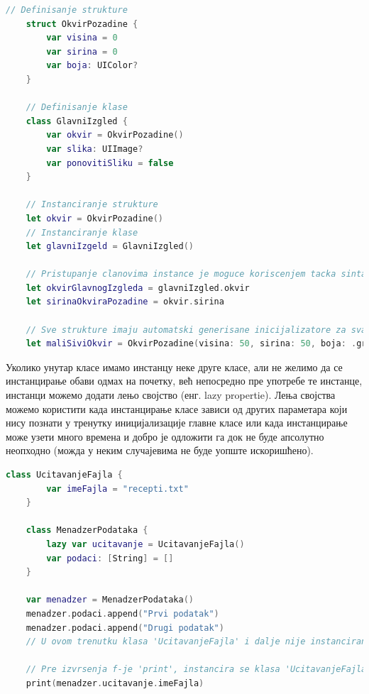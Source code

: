 \documentclass[12pt,oneside]{memoir}
\begin{document}
\begin{lstlisting}[caption=\textit{{Дефинисање класе и структуре}}, label={lst:Дефинисање класе и структуре}, language=Swift, frame=single]
    // Definisanje strukture
    struct OkvirPozadine {
        var visina = 0
        var sirina = 0
        var boja: UIColor?
    }
    
    // Definisanje klase
    class GlavniIzgled {
        var okvir = OkvirPozadine()
        var slika: UIImage?
        var ponovitiSliku = false
    }
    
    // Instanciranje strukture
    let okvir = OkvirPozadine()
    // Instanciranje klase
    let glavniIzgeld = GlavniIzgled()
    
    // Pristupanje clanovima instance je moguce koriscenjem tacka sintakse (eng. dot syntax).
    let okvirGlavnogIzgleda = glavniIzgled.okvir
    let sirinaOkviraPozadine = okvir.sirina
    
    // Sve strukture imaju automatski generisane inicijalizatore za sva svojstva
    let maliSiviOkvir = OkvirPozadine(visina: 50, sirina: 50, boja: .gray)
\end{lstlisting}

\indent Уколико унутар класе имамо инстанцу неке друге класе, али не желимо да се инстанцирање обави одмах на почетку, већ непосредно пре употребе те инстанце, инстанци можемо додати лењо својство (енг. lazy propertie). Лења својства можемо користити када инстанцирање класе зависи од других параметара који нису познати у тренутку иницијализације главне класе или када инстанцирање може узети много времена и добро је одложити га док не буде апсолутно неопходно (можда у неким случајевима не буде уопште искоришћено).

\begin{lstlisting}[caption=\textit{{Лења својства}}, label={lst:Лења својства}, language=Swift, frame=single]
    class UcitavanjeFajla {
        var imeFajla = "recepti.txt"
    }
    
    class MenadzerPodataka {
        lazy var ucitavanje = UcitavanjeFajla()
        var podaci: [String] = []
    }
    
    var menadzer = MenadzerPodataka()
    menadzer.podaci.append("Prvi podatak")
    menadzer.podaci.append("Drugi podatak")
    // U ovom trenutku klasa 'UcitavanjeFajla' i dalje nije instancirana
    
    // Pre izvrsenja f-je 'print', instancira se klasa 'UcitavanjeFajla'
    print(menadzer.ucitavanje.imeFajla)
\end{lstlisting}
\end{document}
